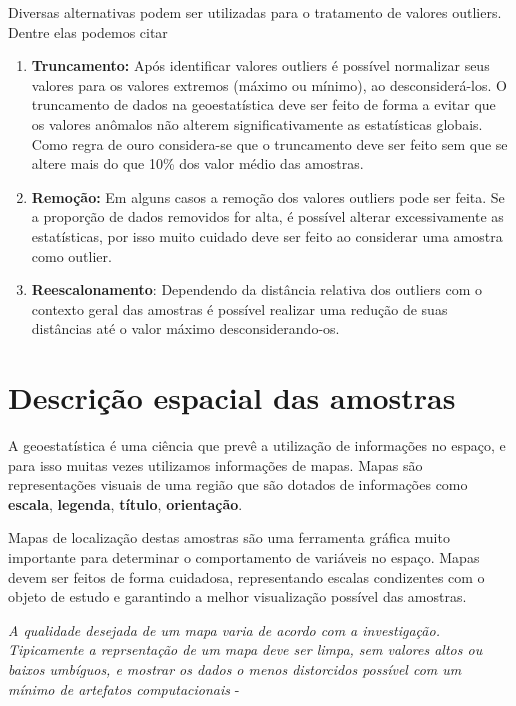 Diversas alternativas podem ser utilizadas para o tratamento de valores outliers. Dentre elas podemos citar 

\begin{enumerate}
	\item \textbf{Truncamento:} Após identificar valores outliers é possível normalizar seus valores para os valores extremos (máximo ou mínimo), ao desconsiderá-los. O truncamento de dados na geoestatística deve ser feito de forma a evitar que os valores anômalos não alterem significativamente as estatísticas globais. Como regra de ouro considera-se que o truncamento deve ser feito sem que se altere mais do que 10\% dos valor médio das amostras.
	\item \textbf{Remoção:} Em alguns casos a remoção dos valores outliers pode ser feita. Se a proporção de dados removidos for alta, é possível alterar excessivamente as estatísticas, por isso muito cuidado deve ser feito ao considerar uma amostra como outlier.
	\item \textbf{Reescalonamento}: Dependendo da distância relativa dos outliers com o contexto geral das amostras é possível realizar uma redução de suas distâncias até o valor máximo desconsiderando-os. 
	
\end{enumerate}

\section{ Descrição espacial das amostras}

A geoestatística é uma ciência que prevê a utilização de informações no espaço, e para isso muitas vezes utilizamos informações de mapas. Mapas são representações visuais de uma região que são dotados de informações como \textbf{escala}, \textbf{legenda}, \textbf{título}, \textbf{orientação}. 

 Mapas de localização destas amostras são uma ferramenta gráfica muito importante para determinar o comportamento de variáveis no espaço. Mapas devem ser feitos de forma cuidadosa, representando escalas condizentes com o objeto de estudo e garantindo a melhor visualização possível das amostras.

\begin{remark}
	\textit{A qualidade desejada de um mapa varia de acordo com a investigação. Tipicamente a reprsentação de um mapa deve ser limpa, sem valores altos ou baixos umbíguos, e mostrar os dados o menos distorcidos possível com um mínimo de artefatos computacionais} - \cite{gustavsson1997visualization}
\end{remark}

